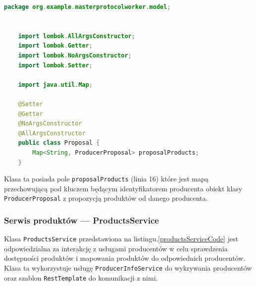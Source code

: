 \begin{lstlisting}[language=Java, caption=Kod klasy Proposal,label=ProposalCode]
    package org.example.masterprotocolworker.model;
    
    
    import lombok.AllArgsConstructor;
    import lombok.Getter;
    import lombok.NoArgsConstructor;
    import lombok.Setter;
    
    import java.util.Map;
    
    @Setter
    @Getter
    @NoArgsConstructor
    @AllArgsConstructor
    public class Proposal {
        Map<String, ProducerProposal> proposalProducts;
    }
\end{lstlisting}

Klasa ta posiada pole \verb|proposalProducts| (linia 16) które jest mapą przechowującą pod kluczem będącym identyfikatorem producenta obiekt klasy \verb|ProducerProposal| z propozycją produktów od danego producenta.

\subsubsection{Serwis produktów --- ProductsService}

Klasa \verb|ProductsService| przedstawiona na listingu.\ref{productsServiceCode} jest odpowiedzialna za interakcję z usługami producentów w celu sprawdzenia dostępności produktów i mapowania produktów do odpowiednich producentów. Klasa ta wykorzystuje usługę \verb|ProducerInfoService| do wykrywania producentów oraz szablon \verb|RestTemplate| do komunikacji z nimi. 

